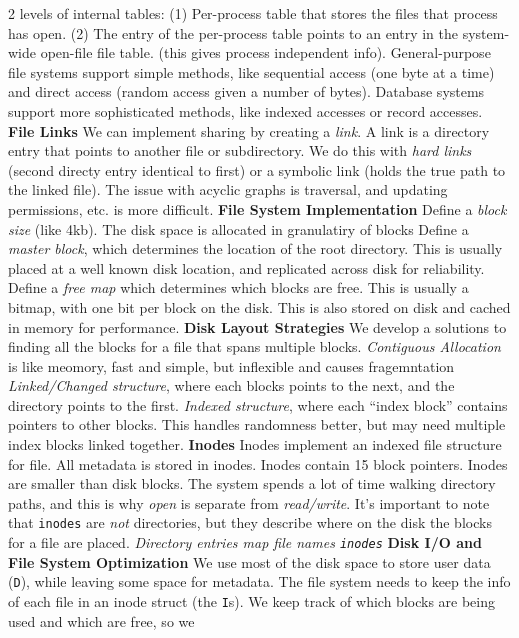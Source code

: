 2 levels of internal tables: (1) Per-process table that stores the files that
process has open. (2) The entry of the per-process table points to an entry in
the system-wide open-file file table. (this gives process independent info).
General-purpose file systems support simple methods, like sequential
access (one byte at a time) and direct access (random access given a
number of bytes).
Database systems support more sophisticated methods, like indexed
accesses or record accesses.
{\bf File Links}
We can implement sharing by creating a \emph{link}. A link is a
directory entry that points to another file or subdirectory. We do this
with \emph{hard links} (second directy entry identical to first) or a
symbolic link (holds the true path to the linked file).
The issue with acyclic graphs is traversal, and updating permissions,
etc. is more difficult.
{\bf File System Implementation}
Define a \emph{block size} (like 4kb). The disk space is allocated in
granulatiry of blocks
Define a \emph{master block}, which determines the location of the root
directory. This is usually placed at a well known disk location, and
replicated across disk for reliability.
Define a \emph{free map} which determines which blocks are free. This is
usually a bitmap, with one bit per block on the disk. This is also
stored on disk and cached in memory for performance.
{\bf Disk Layout Strategies}
We develop a solutions to finding all the blocks for a file that spans multiple
blocks.  \emph{Contiguous Allocation} is like meomory, fast and simple, but
inflexible and causes fragemntation \emph{Linked/Changed structure}, where each
blocks points to the next, and the directory points to the first.
\emph{Indexed structure}, where each ``index block'' contains pointers to other
blocks. This handles randomness better, but may need multiple index blocks
linked together.
{\bf Inodes}
Inodes implement an indexed file structure for file.
All metadata is stored in inodes.
Inodes contain 15 block pointers.
Inodes are smaller than disk blocks.
The system spends a lot of time walking directory paths, and this is why
\emph{open} is separate from \emph{read/write}.
It's important to note that \texttt{inodes} are \emph{not} directories,
but they describe where on the disk the blocks for a file are placed.
\emph{Directory entries map file names \texttt{inodes}}
{\bf Disk I/O and File System
Optimization}
We use most of the disk space to store user data (\texttt{D}), while
leaving some space for metadata.
The file system needs to keep the info of each file in an inode struct
(the \texttt{I}s).
We keep track of which blocks are being used and which are free, so we
